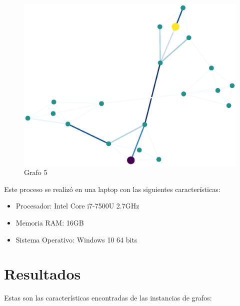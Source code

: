 \documentclass{article}
\begin{document}
\begin{figure}[H]
    \includegraphics[width=\textwidth]{res-5}
    \caption{Grafo 5}
    \label{fig:matriz}
\end{figure}
Este proceso se realizó en una laptop con las siguientes características:
\begin{itemize}
\item{Procesador}: Intel Core i7-7500U 2.7GHz
\item{Memoria RAM}: 16GB 
\item{Sistema Operativo}: Windows 10 64 bits
\end{itemize}

\section{Resultados}
Estas son las características encontradas de las instancias de grafos:
\end{document}
